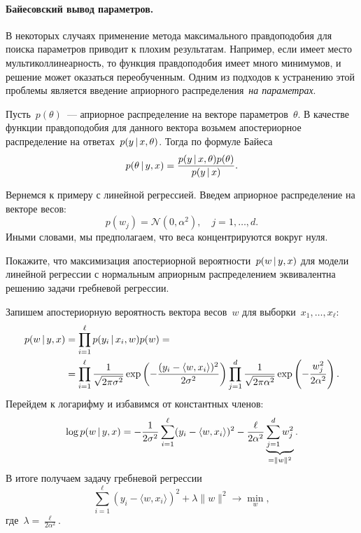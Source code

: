 \documentclass[12pt,fleqn]{article}
\begin{document}
\paragraph{Байесовский вывод параметров.}
В некоторых случаях применение метода максимального правдоподобия
для поиска параметров приводит к плохим результатам.
Например, если имеет место мультиколлинеарность,
то функция правдоподобия имеет много минимумов,
и решение может оказаться переобученным.
Одним из подходов к устранению этой проблемы
является введение априорного распределения~\emph{на параметрах}.

Пусть~$p(\theta)$~--- априорное распределение на векторе параметров~$\theta$.
В качестве функции правдоподобия для данного вектора возьмем
апостериорное распределение на ответах~$p( y \mspace{3mu}{|}\mspace{3mu} x, \theta)$.
Тогда по формуле Байеса
\[
    p(\theta \mspace{3mu}{|}\mspace{3mu} y, x)
    =
    \frac{
        p(y \mspace{3mu}{|}\mspace{3mu} x, \theta) p(\theta)
    }{
        p(y \mspace{3mu}{|}\mspace{3mu} x)
    }.
\]

Вернемся к примеру с линейной регрессией.
Введем априорное распределение на векторе весов:
\[
    p(w_j)
    =
    \mathcal{N}(0, \alpha^2),
    \quad j = 1, \dots, d.
\]
Иными словами, мы предполагаем, что веса концентрируются вокруг нуля.

\begin{vkProblem}
    Покажите, что максимизация апостериорной вероятности~$p(w \mspace{3mu}{|}\mspace{3mu} y, x)$
    для модели линейной регрессии с нормальным априорным распределением
    эквивалентна решению задачи гребневой регрессии.
\end{vkProblem}

\begin{esSolution}
    Запишем апостериорную вероятность вектора весов~$w$ для выборки~$x_1, \dots, x_\ell$:
    \begin{align*}
        p(w \mspace{3mu}{|}\mspace{3mu} y, x)
        &=
        \prod_{i = 1}^{\ell}
            p(y_i \mspace{3mu}{|}\mspace{3mu} x_i, w) p(w)
        =\\
        &=
        \prod_{i = 1}^{\ell}
            \frac{1}{\sqrt{2 \pi \sigma^2}}
            \exp\left(
                - \frac{(y_i - \langle w, x_i \rangle)^2}{2 \sigma^2}
            \right)
            \prod_{j = 1}^{d}
                \frac{1}{\sqrt{2 \pi \alpha^2}}
                \exp\left(
                    - \frac{w_j^2}{2 \alpha^2}
                \right).
    \end{align*}
    Перейдем к логарифму и избавимся от константных членов:
    \[
        \log p(w \mspace{3mu}{|}\mspace{3mu} y, x)
        =
        -\frac{1}{2 \sigma^2} \sum_{i = 1}^{\ell} (y_i - \langle w, x_i \rangle)^2
        -\frac{\ell}{2 \alpha^2} \underbrace{\sum_{j = 1}^{d} w_j^2}_{= \|w\|^2}.
    \]
    В итоге получаем задачу гребневой регрессии
    \[
        \sum_{i = 1}^{\ell} (y_i - \langle w, x_i \rangle)^2  + \lambda \|w\|^2 \to \min_w,
    \]
    где~$\lambda = \frac{\ell}{2 \alpha^2}$.
\end{esSolution}
\end{document}
